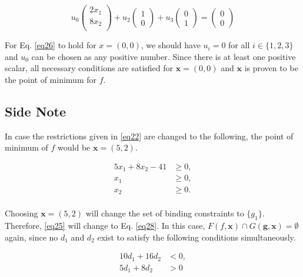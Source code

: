 \begin{equation}
u_0 \begin{pmatrix} 2x_1\\ 8x_2\\ \end{pmatrix} + u_2 \begin{pmatrix} 1\\ 0\end{pmatrix} + u_3 \begin{pmatrix} 0\\ 1\end{pmatrix} = \begin{pmatrix}
0 \\ 0 \end{pmatrix}
\label{eq26}
\end{equation}

For Eq. \ref{eq26} to hold for $x = (0, 0)$, we should have $u_i = 0$ for all $i\in \{1,2,3\}$ and $u_0$ can be chosen as any positive number. Since there is at least one positive scalar, all necessary conditions are satisfied for $\mathbf{x} = (0, 0)$ and $\mathbf{x}$ is proven to be the point of minimum for $f$.

\subsection*{Side Note}

In case the restrictions given in \ref{eq22} are changed to the following, the point of minimum of $f$ would be $\mathbf{x} = (5,2)$.

\begin{equation}
\begin{aligned}
5x_1 + 8x_2 - 41 &\geqslant 0,\\
x_1 &\geqslant 0,\\
x_2 &\geqslant 0.\\
\end{aligned}
\label{eq27}
\end{equation}

Choosing $\mathbf{x} = (5,2)$ will change the set of binding constraints to $\{g_1\}$. Therefore, \ref{eq25} will change to Eq. \ref{eq28}. In this case, $F(f,\mathbf{x}) \cap G(\mathbf{g}, \mathbf{x}) = \emptyset$ again, since no $d_1$ and $d_2$ exist to satisfy the following conditions simultaneously.

\begin{equation}
\begin{aligned}
10d_1 + 16d_2 &< 0,\\
5d_1 + 8d_2 &> 0\\
\end{aligned}
\label{eq28}
\end{equation}

